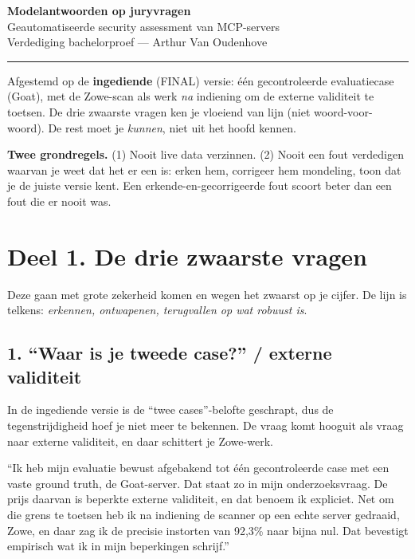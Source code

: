 \documentclass[11pt,a4paper]{article}
\begin{document}
{\Huge\bfseries\color{hgteal} Modelantwoorden op juryvragen}\\[0.4em]
{\large Geautomatiseerde security assessment van MCP-servers}\\[0.2em]
{\color{hggrey} Verdediging bachelorproef --- Arthur Van Oudenhove}

\vspace{0.7em}
\hrule
\vspace{0.6em}

Afgestemd op de \textbf{ingediende} (FINAL) versie: \'e\'en gecontroleerde
evaluatiecase (Goat), met de Zowe-scan als werk \emph{na} indiening om de externe
validiteit te toetsen. De drie zwaarste vragen ken je vloeiend van lijn (niet
woord-voor-woord). De rest moet je \emph{kunnen}, niet uit het hoofd kennen.

\textbf{Twee grondregels.} (1) Nooit live data verzinnen. (2) Nooit een fout
verdedigen waarvan je weet dat het er een is: erken hem, corrigeer hem mondeling,
toon dat je de juiste versie kent. Een erkende-en-gecorrigeerde fout scoort beter
dan een fout die er nooit was.

\section{Deel 1. De drie zwaarste vragen}

Deze gaan met grote zekerheid komen en wegen het zwaarst op je cijfer. De lijn is
telkens: \emph{erkennen, ontwapenen, terugvallen op wat robuust is}.

\subsection{1. ``Waar is je tweede case?'' / externe validiteit}
In de ingediende versie is de ``twee cases''-belofte geschrapt, dus de
tegenstrijdigheid hoef je niet meer te bekennen. De vraag komt hooguit als vraag
naar externe validiteit, en daar schittert je Zowe-werk.

\begin{antwoord}
``Ik heb mijn evaluatie bewust afgebakend tot \'e\'en gecontroleerde case met een
vaste ground truth, de Goat-server. Dat staat zo in mijn onderzoeksvraag. De prijs
daarvan is beperkte externe validiteit, en dat benoem ik expliciet. Net om die
grens te toetsen heb ik na indiening de scanner op een echte server gedraaid,
Zowe, en daar zag ik de precisie instorten van 92,3\% naar bijna nul. Dat bevestigt
empirisch wat ik in mijn beperkingen schrijf.''
\end{antwoord}
\end{document}
